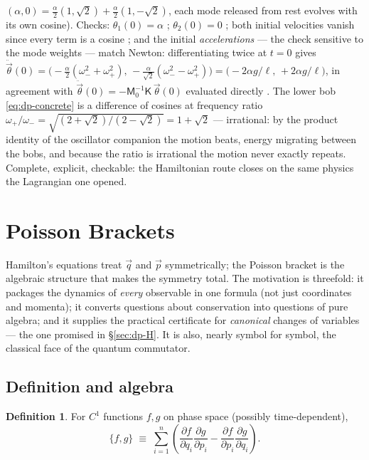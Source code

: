 \documentclass[11pt]{article}
\theoremstyle{plain}
\theoremstyle{definition}
\newtheorem{definition}[theorem]{Definition}
\theoremstyle{remark}
\newcommand{\pd}[2]{\frac{\partial #1}{\partial #2}}
\newcommand{\vq}{\vec{q}}
\newcommand{\vp}{\vec{p}}
\newcommand{\vth}{\vec{\theta}}
\newcommand{\mM}{\mathsf{M}}
\newcommand{\mK}{\mathsf{K}}
\begin{document}
$(\alpha, 0) = \tfrac\alpha2(1,\sqrt2) + \tfrac\alpha2(1,-\sqrt2)$,
each mode released from rest evolves with its own cosine). Checks:
$\theta_1(0) = \alpha$ \checkmark; $\theta_2(0) = 0$ \checkmark; both
initial velocities vanish since every term is a cosine \checkmark; and
the initial \emph{accelerations} --- the check sensitive to the mode
weights --- match Newton: differentiating twice at $t = 0$ gives
$\ddot\vth(0) = \bigl(-\tfrac\alpha2(\omega_-^2 + \omega_+^2),\,
-\tfrac\alpha{\sqrt2}(\omega_-^2 - \omega_+^2)\bigr)
= \bigl(-2\alpha g/\ell,\, +2\alpha g/\ell\bigr)$, in agreement with
$\ddot\vth(0) = -\mM_0^{-1}\mK\,\vth(0)$ evaluated directly
\checkmark. The lower bob
\eqref{eq:dp-concrete} is a difference of cosines at frequency ratio
$\omega_+/\omega_- = \sqrt{(2{+}\sqrt2)/(2{-}\sqrt2)} = 1 + \sqrt2$ ---
irrational: by the product identity of the oscillator companion the
motion beats, energy migrating between the bobs, and because the ratio is
irrational the motion never exactly repeats. Complete, explicit,
checkable: the Hamiltonian route closes on the same physics the
Lagrangian one opened.

\section{Poisson Brackets}
\label{sec:poisson}

Hamilton's equations treat $\vq$ and $\vp$ symmetrically; the Poisson
bracket is the algebraic structure that makes the symmetry total. The
motivation is threefold: it packages the dynamics of \emph{every}
observable in one formula (not just coordinates and momenta); it converts
questions about conservation into questions of pure algebra; and it
supplies the practical certificate for \emph{canonical} changes of
variables --- the one promised in \S\ref{sec:dp-H}. It is also, nearly
symbol for symbol, the classical face of the quantum commutator.

\subsection{Definition and algebra}

\begin{definition}
For $C^1$ functions $f, g$ on phase space (possibly time-dependent),
\begin{equation}
  \boxed{\;
  \{f, g\}
  \;\equiv\;
  \sum_{i=1}^n\left(\pd{f}{q_i}\pd{g}{p_i} - \pd{f}{p_i}\pd{g}{q_i}\right).
  \;}
\end{equation}
\end{definition}
\end{document}
